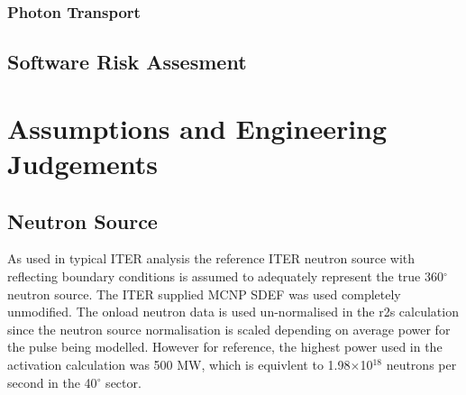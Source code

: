 \documentclass[12pt]{article}
\begin{document}
\subsubsection{Photon Transport}

\subsection{Software Risk Assesment}
\clearpage
\newpage
\section{Assumptions and Engineering Judgements}
\subsection{Neutron Source}
As used in typical ITER analysis the reference ITER neutron source with
reflecting boundary conditions is assumed to adequately represent the
true 360$^{\circ}$ neutron source. The ITER supplied MCNP SDEF was used
completely unmodified. The onload neutron data is used un-normalised
in the \gls{r2s} calculation since the neutron source normalisation is scaled
depending on average power for the pulse being modelled. However for reference,
the highest power used in the activation calculation was 500 MW, which is
equivlent to 1.98$\times$10$^{18}$ neutrons per second in the 40$^{\circ}$ sector.
\end{document}
